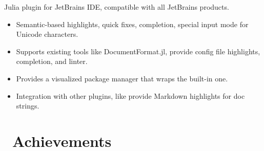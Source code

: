 \documentclass{style/resume2}
\begin{document}
Julia plugin for JetBrains IDE, compatible with all JetBrains products.
\begin{itemize}
  \item Semantic-based highlights, quick fixes, completion, special input mode for Unicode characters.
  \item Supports existing tools like DocumentFormat.jl, provide config file highlights, completion, and linter.
  \item Provides a visualized package manager that wraps the built-in one.
  \item Integration with other plugins, like provide Markdown highlights for doc strings.
\end{itemize}


\section{\faHeartO\ Achievements}
\end{document}
